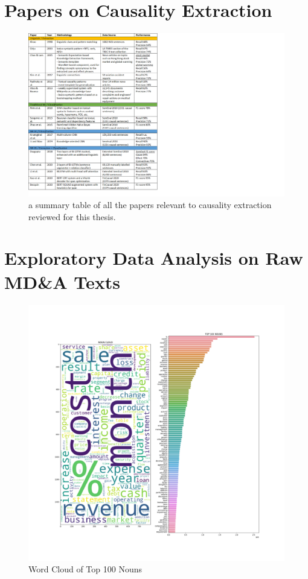 \section{Papers on Causality Extraction}
\label{appendix:CEpapers}

\begin{figure}[h!]
\centering
  \includegraphics[scale=0.9]{figures/CE_papers.png}
  \caption{a summary table of all the papers relevant to causality extraction reviewed for this thesis.}
\end{figure}


\section{Exploratory Data Analysis on Raw MD\&A Texts} \label{appendix:EDA}

\begin{figure}
    \includegraphics[width=\textwidth] {figures/NOUN_top100_figure.png}
    \caption{Word Cloud of Top 100 Nouns}
    \label{fig:NOUN}
\end{figure}

